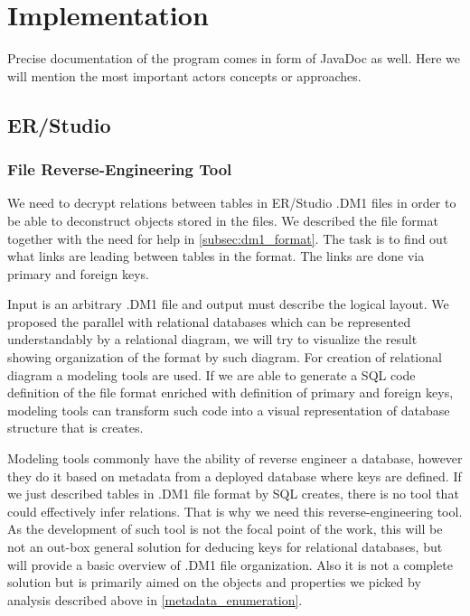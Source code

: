 \chapter{Implementation}

Precise documentation of the program comes in form of JavaDoc as well. Here we will mention the most important actors concepts or approaches.

\section{ER/Studio}

\subsection{File Reverse-Engineering Tool}
\label{subsec:dm1_tool}

We need to decrypt relations between tables in ER/Studio .DM1 files in order to be able to deconstruct objects stored in the files. 
We described the file format together with the need for help in \autoref{subsec:dm1_format}.
The task is to find out what links are leading between tables in the format. The links are done via primary and foreign keys.

Input is an arbitrary .DM1 file and output must describe the logical layout. 
We proposed the parallel with relational databases which can be represented understandably by a relational diagram, we will try to visualize the result showing organization of the format by such diagram. 
For creation of relational diagram a modeling tools are used. 
If we are able to generate a SQL code definition of the file format enriched with definition of primary and foreign keys, modeling tools can transform such code into a visual representation of database structure that is creates.

Modeling tools commonly have the ability of reverse engineer a database, however they do it based on metadata from a deployed database where keys are defined. 
If we just described tables in .DM1 file format by SQL creates, there is no tool that could effectively infer relations. That is why we need this reverse-engineering tool.
As the development of such tool is not the focal point of the work, this will be not an out-box general solution for deducing keys for relational databases, but will provide a basic overview of .DM1 file organization. Also it is not a complete solution but is primarily aimed on the objects and properties we picked by analysis described above in \autoref{metadata_enumeration}.

